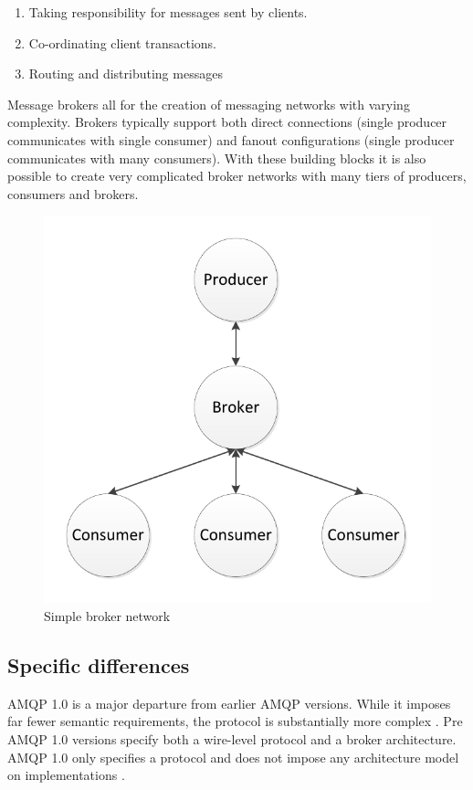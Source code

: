 \documentclass{thesis}
\begin{document}
\begin{enumerate}
\item Taking responsibility for messages sent by clients.
\item Co-ordinating client transactions.
\item Routing and distributing messages 
\end{enumerate}

Message brokers all for the creation of messaging networks with varying complexity.  Brokers typically support both direct connections (single producer communicates with single consumer) and fanout configurations (single producer communicates with many consumers).  With these building blocks it is also possible to create very complicated broker networks with many tiers of producers, consumers and brokers. 

\begin{figure}[h]
\centering
\includegraphics[scale=.75]{simple_fanout}  
\caption{Simple broker network}
\end{figure}

\subsection {Specific differences}

AMQP 1.0 is a major departure from earlier AMQP versions.  While it imposes far fewer semantic requirements, the protocol is substantially more complex \cite{RABBITMQ_PROTOCOLS}.  Pre AMQP 1.0 versions specify both a  wire-level protocol and a broker architecture.  AMQP 1.0 only specifies a protocol and does not impose any architecture model on implementations \cite{REDHAT1}.
\end{document}
